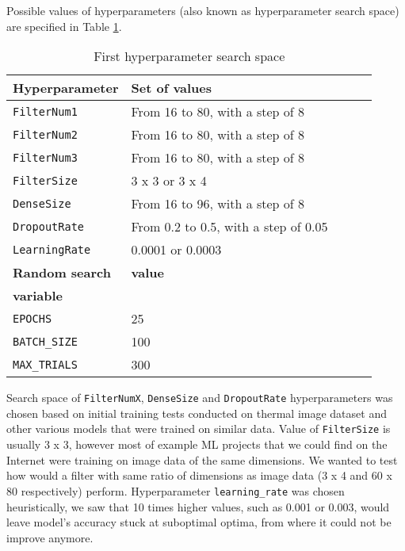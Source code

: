 Possible values of hyperparameters (also known as hyperparameter search space) are specified in Table \ref{hyper_table1}.
\newline
\begin{table}[ht]
    \centering
    \caption{ First hyperparameter search space}
    \begin{tabular}{@{} *5l @{}}    \toprule
        \textbf{Hyperparameter} & \textbf{Set of values}\\\midrule
        \verb|FilterNum1|       & From 16 to 80, with a step of 8\\ 
        \verb|FilterNum2|       & From 16 to 80, with a step of 8\\ 
        \verb|FilterNum3|       & From 16 to 80, with a step of 8\\
        \verb|FilterSize|       & 3 x 3 or 3 x 4\\
        \verb|DenseSize|        & From 16 to 96, with a step of 8\\
        \verb|DropoutRate|      & From 0.2 to 0.5, with a step of 0.05\\
        \verb|LearningRate|     & 0.0001 or 0.0003\\\toprule
        \textbf{Random search}  & \textbf{value}\\
        \textbf{variable}       & \\\midrule
        \verb|EPOCHS|           & 25\\
        \verb|BATCH_SIZE|       & 100\\
        \verb|MAX_TRIALS|       & 300\\\bottomrule
    \end{tabular}
    \label{hyper_table1}
\end{table}

Search space of \verb|FilterNumX|, \verb|DenseSize| and \verb|DropoutRate| hyperparameters was chosen based on initial training tests conducted on thermal image dataset and other various models that were trained on similar data.
Value of \verb|FilterSize| is usually 3 x 3, however most of example ML projects that we could find on the Internet were training on image data of the same dimensions.
We wanted to test how would a filter with same ratio of dimensions as image data (3 x 4 and 60 x 80 respectively) perform.
Hyperparameter \verb|learning_rate| was chosen heuristically, we saw that 10 times higher values, such as 0.001 or 0.003, would leave model's accuracy stuck at suboptimal optima, from where it could not be improve anymore.

